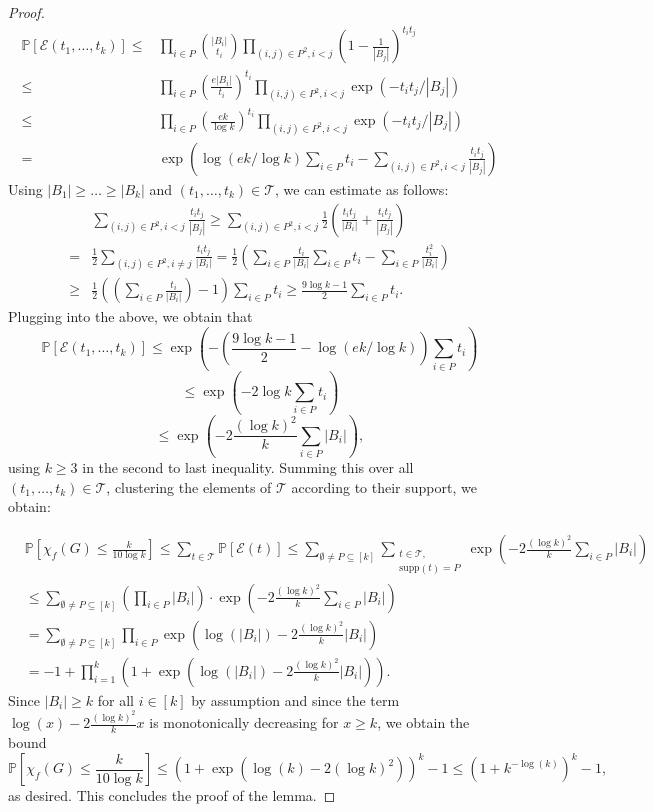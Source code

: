 \documentclass[a4paper,10pt]{amsart}
\begin{document}
\begin{proof}
\begin{align*}\mathbb{P}[\mathcal{E}(t_1,\ldots,t_k)]\le & \prod_{i\in P}{\binom{|B_i|}{t_i}}\prod_{(i,j)\in P^2, i<j}\left(1-\frac{1}{|B_j|}\right)^{t_it_j} \\
\le & \prod_{i\in P}\left(\frac{e|B_i|}{t_i}\right)^{t_i} \prod_{(i,j)\in P^2, i<j}\exp(-t_it_j/|B_j|)\\
\le & \prod_{i\in P}\left(\frac{ek}{\log k}\right)^{t_i} \prod_{(i,j)\in P^2, i<j}\exp(-t_it_j/|B_j|) \\
= & \exp\left(\log(ek/\log k)\sum_{i\in P}t_i-\sum_{(i,j)\in P^2, i<j}\frac{t_it_j}{|B_j|}\right)
\end{align*}
Using $|B_1|\ge\dots\ge |B_k|$ and $(t_1,\ldots,t_k)\in \mathcal{T}$, we can estimate as follows:
\begin{align*}&\sum_{(i,j)\in P^2, i<j}\frac{t_it_j}{|B_j|}\ge \sum_{(i,j)\in P^2, i<j}\frac{1}{2}\left(\frac{t_it_j}{|B_i|}+\frac{t_it_j}{|B_j|}\right)\\
=& \frac{1}{2}\sum_{(i,j)\in P^2, i\neq j}\frac{t_it_j}{|B_i|}=\frac{1}{2}\left(\sum_{i\in P}\frac{t_i}{|B_i|}\sum_{i\in P}{t_i}-\sum_{i\in P}\frac{t_i^2}{|B_i|}\right)\\
\ge& \frac{1}{2}\left(\left(\sum_{i\in P}\frac{t_i}{|B_i|}\right)-1\right)\sum_{i\in P}{t_i} \ge \frac{9\log k-1}{2}\sum_{i\in P}{t_i}.
\end{align*}
Plugging into the above, we obtain that
$$\mathbb{P}[\mathcal{E}(t_1,\ldots,t_k)]\le \exp\left(-\left(\frac{9\log k-1}{2}-\log(ek/\log k)\right)\sum_{i\in P}{t_i}\right)$$ $$\le \exp\left(-2\log k\sum_{i\in P}{t_i}\right)$$
$$\le \exp\left(-2\frac{(\log k)^2}{k}\sum_{i\in P}{|B_i|}\right),$$ using $k\ge 3$ in the second to last inequality. Summing this over all $(t_1,\ldots,t_k)\in \mathcal{T}$, clustering the elements of $\mathcal{T}$ according to their support, we obtain:

\begin{align*}
&\mathbb{P}\left[\chi_f(G)\le \frac{k}{10\log k}\right] \le \sum_{t\in \mathcal{T}}\mathbb{P}[\mathcal{E}(t)]\le \sum_{\emptyset\neq P\subseteq [k]}\sum_{\substack{t\in \mathcal{T}, \\ \mathrm{supp}(t)=P}}\exp\left(-2\frac{(\log k)^2}{k}\sum_{i\in P}|B_i|\right) \\
&\le \sum_{\emptyset\neq P\subseteq [k]}\left(\prod_{i\in P}{|B_i|}\right)\cdot \exp\left(-2\frac{(\log k)^2}{k}\sum_{i\in P}|B_i|\right) \\
&=\sum_{\emptyset\neq P\subseteq [k]}\prod_{i\in P}{\exp\left(\log(|B_i|)-2\frac{(\log k)^2}{k}|B_i|\right)}\\
&=-1+\prod_{i=1}^{k}\left(1+\exp\left(\log(|B_i|)-2\frac{(\log k)^2}{k}|B_i|\right)\right).
\end{align*}
Since $|B_i|\ge k$ for all $i\in [k]$ by assumption and since the term $\log(x)-2\frac{(\log k)^2}{k}x$ is monotonically decreasing for $x\ge k$, we obtain the bound
$$\mathbb{P}\left[\chi_f(G)\le \frac{k}{10\log k}\right]\le \left(1+\exp(\log(k)-2(\log k)^2)\right)^k-1\le \left(1+k^{-\log(k)}\right)^k-1,$$
as desired. This concludes the proof of the lemma.
\end{proof}
\end{document}
